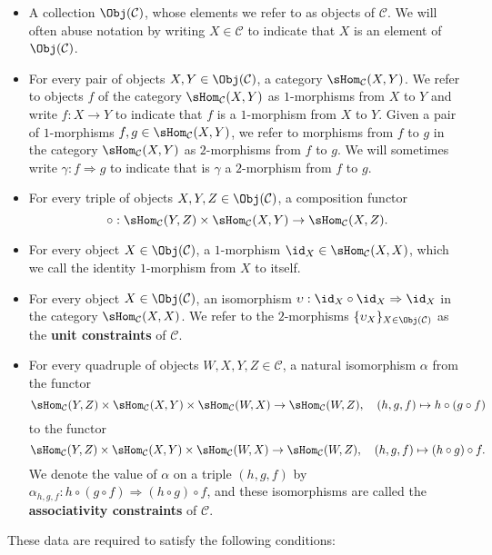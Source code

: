 \begin{itemize}
\item A collection $\Obj(\mathcal{C})$, whose elements we refer to as objects of $\mathcal{C}$. We will often abuse notation by writing $X\in\mathcal{C}$ to indicate that $X$ is an element of $\Obj(\mathcal{C})$.
\item For every pair of objects $X,Y\in\Obj(\mathcal{C})$, a category $\sHom_{\mathcal{C}}(X,Y)$. We refer to objects $f$ of the category $\sHom_{\mathcal{C}}(X,Y)$ as $1$-morphisms from $X$ to $Y$ and write $f:X\to Y$ to indicate that $f$ is a $1$-morphism from $X$ to $Y$. Given a pair of $1$-morphisms $f,g\in\sHom_{\mathcal{C}}(X,Y)$, we refer to morphisms from $f$ to $g$ in the category $\sHom_{\mathcal{C}}(X,Y)$ as $2$-morphisms from $f$ to $g$. We will sometimes write $\gamma:f\Rightarrow g$ to indicate that is $\gamma$ a $2$-morphism from $f$ to $g$.
\item For every triple of objects $X,Y,Z\in\Obj(\mathcal{C})$, a composition functor
\[\circ:\sHom_{\mathcal{C}}(Y,Z)\times\sHom_{\mathcal{C}}(X,Y)\to\sHom_{\mathcal{C}}(X,Z).\]
\item For every object $X\in\Obj(\mathcal{C})$, a $1$-morphism $\id_X\in\sHom_{\mathcal{C}}(X,X)$, which we call the identity $1$-morphism from $X$ to itself.
\item For every object $X\in\Obj(\mathcal{C})$, an isomorphism $\upsilon:\id_X\circ\id_X\Rightarrow\id_X$ in the category $\sHom_{\mathcal{C}}(X,X)$. We refer to the $2$-morphisms $\{\upsilon_X\}_{X\in\Obj(\mathcal{C})}$ as the \textbf{unit constraints} of $\mathcal{C}$.
\item For every quadruple of objects $W,X,Y,Z\in\mathcal{C}$, a natural isomorphism $\alpha$ from the functor
\[\sHom_{\mathcal{C}}(Y,Z)\times\sHom_{\mathcal{C}}(X,Y)\times\sHom_{\mathcal{C}}(W,X)\to\sHom_{\mathcal{C}}(W,Z),\quad (h,g,f)\mapsto h\circ(g\circ f)\]
to the functor
\[\sHom_{\mathcal{C}}(Y,Z)\times\sHom_{\mathcal{C}}(X,Y)\times\sHom_{\mathcal{C}}(W,X)\to\sHom_{\mathcal{C}}(W,Z),\quad (h,g,f)\mapsto (h\circ g)\circ f.\]
We denote the value of $\alpha$ on a triple $(h,g,f)$ by $\alpha_{h,g,f}:h\circ(g\circ f)\Rightarrow(h\circ g)\circ f$, and these isomorphisms are called the \textbf{associativity constraints} of $\mathcal{C}$.\par
\end{itemize}
These data are required to satisfy the following conditions:
